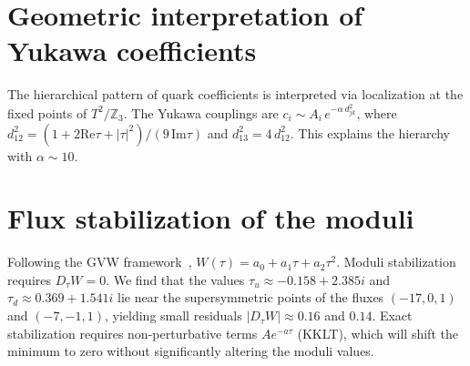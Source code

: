 \documentclass[12pt,a4paper]{article}
\numberwithin{equation}{section}
\begin{document}
\section{Geometric interpretation of Yukawa coefficients}
The hierarchical pattern of quark coefficients is interpreted via localization at the fixed points of \(T^2/\mathbb{Z}_3\). The Yukawa couplings are \(c_i \sim A_i \, e^{- \alpha \, d^2_{jk}}\), where \(d_{12}^2 = (1 + 2\mathrm{Re}\tau + |\tau|^2)/(9\,\mathrm{Im}\tau)\) and \(d_{13}^2 = 4\,d_{12}^2\). This explains the hierarchy with \(\alpha \sim 10\).

\section{Flux stabilization of the moduli}
\label{sec:flux_stabilization}
Following the GVW framework~\cite{GVW2000}, \(W(\tau) = a_0 + a_1 \tau + a_2 \tau^2\). Moduli stabilization requires \(D_\tau W = 0\). We find that the values \(\tau_u \approx -0.158 + 2.385i\) and \(\tau_d \approx 0.369 + 1.541i\) lie near the supersymmetric points of the fluxes \((-17, 0, 1)\) and \((-7, -1, 1)\), yielding small residuals \(|D_\tau W| \approx 0.16\) and \(0.14\). Exact stabilization requires non-perturbative terms \(A e^{-a \tau}\) (KKLT), which will shift the minimum to zero without significantly altering the moduli values.
\end{document}
